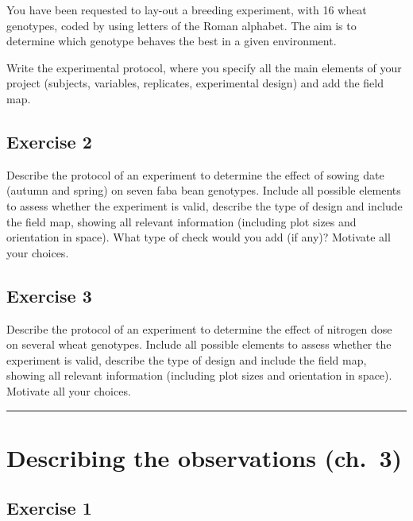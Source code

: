 \documentclass[a4paper,12pt,oneside]{book}
\begin{document}
You have been requested to lay-out a breeding experiment, with 16 wheat genotypes, coded by using letters of the Roman alphabet. The aim is to determine which genotype behaves the best in a given environment.

Write the experimental protocol, where you specify all the main elements of your project (subjects, variables, replicates, experimental design) and add the field map.

\hypertarget{exercise-2}{%
\subsection{Exercise 2}\label{exercise-2}}

Describe the protocol of an experiment to determine the effect of sowing date (autumn and spring) on seven faba bean genotypes. Include all possible elements to assess whether the experiment is valid, describe the type of design and include the field map, showing all relevant information (including plot sizes and orientation in space). What type of check would you add (if any)? Motivate all your choices.

\hypertarget{exercise-3}{%
\subsection{Exercise 3}\label{exercise-3}}

Describe the protocol of an experiment to determine the effect of nitrogen dose on several wheat genotypes. Include all possible elements to assess whether the experiment is valid, describe the type of design and include the field map, showing all relevant information (including plot sizes and orientation in space). Motivate all your choices.

\begin{center}\rule{0.5\linewidth}{0.5pt}\end{center}

\hypertarget{describing-the-observations-ch.-3}{%
\section{Describing the observations (ch.~3)}\label{describing-the-observations-ch.-3}}

\hypertarget{exercise-1}{%
\subsection{Exercise 1}\label{exercise-1}}
\end{document}
